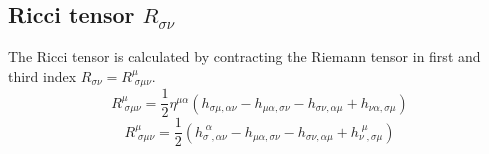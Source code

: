 \subsection{Ricci tensor $R_{\sigma\nu}$}

The Ricci tensor is calculated by contracting the Riemann tensor in first and third index $R_{\sigma\nu} = R^{\mu}_{\;\sigma\mu\nu}$.
$$R^\mu_{\;\sigma\mu\nu} = \frac{1}{2}\eta^{\mu\alpha}(h_{\sigma\mu,\alpha\nu}-h_{\mu\alpha,\sigma\nu}-h_{\sigma\nu,\alpha\mu}+h_{\nu\alpha,\sigma\mu})$$
$$R^\mu_{\;\sigma\mu\nu} = \frac{1}{2}(h^{\;\alpha}_{\sigma\;,\alpha\nu}-h_{\mu\alpha,\sigma\nu}-h_{\sigma\nu,\alpha\mu}+h^{\;\mu}_{\nu\;,\sigma\mu})$$









